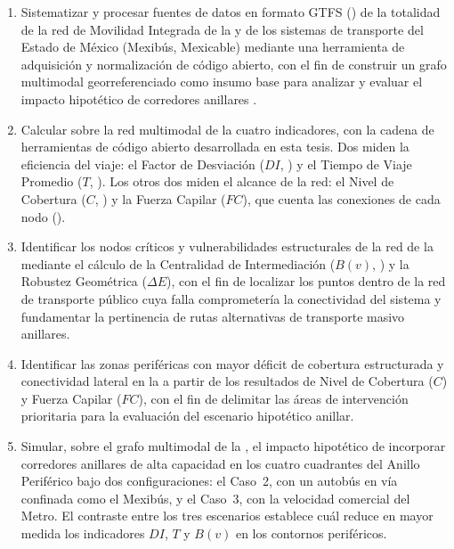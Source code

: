 \begin{enumerate}
\item Sistematizar y procesar fuentes de datos en 
    formato GTFS (\gtfs{}) de la
    totalidad de la red de Movilidad Integrada de la \cdmx{} y de los sistemas
    de transporte del Estado de México (Mexibús, Mexicable) mediante una
    herramienta de adquisición y normalización de código abierto, con el fin
    de construir un grafo multimodal georreferenciado como insumo base 
    para analizar y evaluar el impacto hipotético de corredores anillares .

\item Calcular sobre la red multimodal de la \zmvm{} cuatro indicadores, con la
    cadena de herramientas de código abierto desarrollada en esta tesis. Dos
    miden la eficiencia del viaje: el Factor de Desviación ($DI$,
    ) y el Tiempo de Viaje Promedio ($T$,
    ). Los otros dos miden el alcance de la red:
    el Nivel de Cobertura ($C$, ) y la Fuerza Capilar
    ($FC$), que cuenta las conexiones de cada nodo (). 

\item Identificar los nodos críticos y vulnerabilidades estructurales de la
    red de la \zmvm{} mediante el cálculo de la Centralidad de Intermediación
    ($B(v)$, ) y la Robustez Geométrica ($\Delta E$),
    con el fin de localizar
    los puntos dentro de la red de transporte público
    cuya falla comprometería la conectividad 
    del sistema y fundamentar la pertinencia de rutas 
    alternativas de transporte masivo anillares.

\item Identificar las zonas periféricas con mayor déficit de cobertura
    estructurada y conectividad lateral en la \zmvm{} a partir de los
    resultados de Nivel de Cobertura ($C$) y Fuerza Capilar ($FC$),
    con el fin de delimitar las áreas de intervención prioritaria para
    la evaluación del escenario hipotético anillar.

\item Simular, sobre el grafo multimodal de la \zmvm{}, el impacto hipotético
    de incorporar corredores anillares de alta capacidad en los cuatro
    cuadrantes del Anillo Periférico bajo dos configuraciones: el Caso~2,
    con un autobús en vía confinada como el Mexibús, y el Caso~3, con la
    velocidad comercial del Metro. El contraste entre los tres escenarios
    establece cuál reduce en mayor medida los indicadores $DI$, $T$ y $B(v)$ en
    los contornos periféricos.

\end{enumerate}

